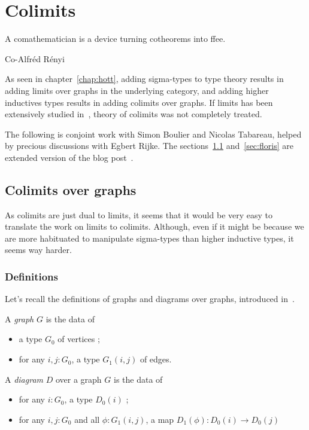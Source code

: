 
\chapter{Colimits}
\label{chap:colim}

\epigraph{A comathematician is a device turning cotheorems into
  ffee.}{Co-Alfréd Rényi}


As seen in chapter~\ref{chap:hott}, adding sigma-types to type theory
results in adding limits over graphs in the underlying category, and
adding higher inductives types results in adding colimits over
graphs. If limits has been extensively studied in~\cite{lumsdaine},
theory of colimits was not completely treated.

The following is conjoint work with Simon Boulier and Nicolas
Tabareau, helped by precious discussions with Egbert Rijke.
The sections~\ref{sec:colim} and~\ref{sec:floris} are extended version
of the blog post~\cite{boulier}.

\section{Colimits over graphs}
\label{sec:colim}

As colimits are just dual to limits, it seems that it would be very
easy to translate the work on limits to colimits. Although, even if
it might be because we are more habituated to manipulate sigma-types
than higher inductive types, it seems way harder.

\subsection{Definitions}
\label{ssec:colim:defi}

Let's recall the definitions of graphs and diagrams over graphs,
introduced in~\cite{lumsdaine}.

\begin{defi}[Graph]\label{defi:graph}
  A {\em graph} $G$ is the data of
  \begin{itemize}
  \item a type $G_0$ of vertices ;
  \item for any $i,j:G_0$, a type $G_1(i,j)$ of edges.
  \end{itemize}
\end{defi}

\begin{defi}[Diagram]\label{defi:diagram}
  A {\em diagram} $D$ over a graph $G$ is the data of
  \begin{itemize}
  \item for any $i:G_0$, a type $D_0(i)$ ;
  \item for any $i,j:G_0$ and all $\phi : G_1(i,j)$, a map $D_1(\phi)
    : D_0(i) \to D_0(j)$
  \end{itemize}
\end{defi}

